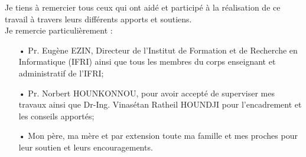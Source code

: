 \remerciements


      Je tiens à remercier tous ceux qui ont aidé et participé à la réalisation de ce travail à travers leurs différents apports et soutiens. \\
	\hspace*{.5cm}Je remercie particulièrement : \\
	\begin{itemize}
		\item[•] Pr. Eugène EZIN, Directeur de l'Institut de Formation et de Recherche en Informatique (IFRI) ainsi que tous les membres du corps enseignant et administratif de l'IFRI;
		\item[•] Pr. Norbert HOUNKONNOU, pour avoir accepté de superviser mes travaux ainsi que Dr-Ing. Vinasétan Ratheil HOUNDJI pour l'encadrement et les conseils apportés;
		\item[•] Mon père, ma mère et par extension toute ma famille et mes proches pour leur soutien et leurs encouragements. 
	\end{itemize}
